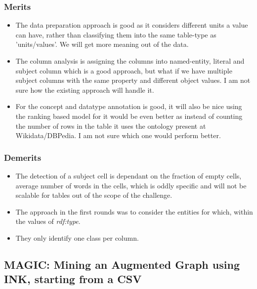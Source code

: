 \documentclass[runningheads]{llncs}
\begin{document}
\subsubsection*{Merits}
\begin{itemize}
    \item The data preparation approach is good as it considers different units a value can have, rather than classifying them into the same table-type as 'units/values'. We will get
    more meaning out of the data. 
    \item The column analysis is assigning the columns into named-entity, literal and subject column which is a good approach, but what if we have multiple subject columns with the same property and different object values. I am not sure how the existing approach will handle it.
    \item For the concept and datatype annotation is good, it will also be nice using the ranking based model for it would be even better as instead of counting the number of rows in the table it uses the ontology present at Wikidata/DBPedia. I am not sure which one would perform better.
\end{itemize}
\subsubsection*{Demerits}
\begin{itemize}
    \item The detection of a subject cell is dependant on the fraction of empty cells, average number of words in the cells, which is oddly specific and will not be scalable for tables out of the scope of the challenge.
    \item The approach in the first rounds was to consider the entities for which, within the values of \textit{rdf:type}.
    \item They only identify one class per column.
\end{itemize}
\subsection{MAGIC: Mining an Augmented Graph using INK, starting from a CSV}
\end{document}
